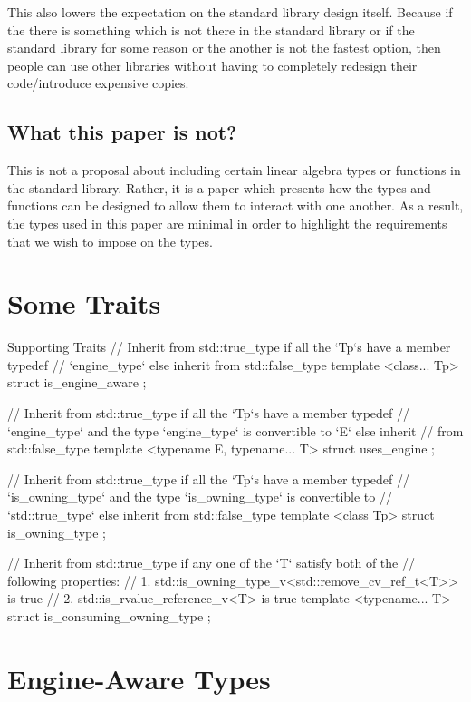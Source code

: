 \documentclass[oneside,11pt,a4paper]{jbarticle}
\begin{document}
This also lowers the expectation on the standard library design itself. Because
if the there is something which is not there in the standard library or if the
standard library for some reason or the another is not the fastest option, then
people can use other libraries without having to completely redesign their
code/introduce expensive copies.

\subsection{What this paper is not?}
This is not a proposal about including certain linear algebra types or functions
in the standard library. Rather, it is a paper which presents how the types and
functions can be designed to allow them to interact with one another. As a
result, the types used in this paper are minimal in order to highlight the
requirements that we wish to impose on the types.

\section{Some Traits}
\begin{codecpp}{Supporting Traits}
// Inherit from std::true_type if all the `Tp`s have a member typedef
// `engine_type` else inherit from std::false_type
template <class... Tp>
struct is_engine_aware {
};

// Inherit from std::true_type if all the `Tp`s have a member typedef
// `engine_type` and the type `engine_type` is convertible to `E` else inherit
// from std::false_type
template <typename E, typename... T>
struct uses_engine {
};


// Inherit from std::true_type if all the `Tp`s have a member typedef
// `is_owning_type` and the type `is_owning_type` is convertible to
// `std::true_type` else inherit from std::false_type
template <class Tp>
struct is_owning_type {
};

// Inherit from std::true_type if any one of the `T` satisfy both of the
// following properties:
// 1. std::is_owning_type_v<std::remove_cv_ref_t<T>> is true
// 2. std::is_rvalue_reference_v<T> is true
template <typename... T>
struct is_consuming_owning_type {
};
\end{codecpp}



\section{Engine-Aware Types}
\end{document}
